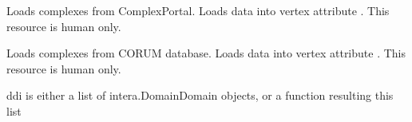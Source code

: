 \documentclass[letterpaper,10pt,english]{sphinxmanual}
\begin{document}
\begin{fulllineitems}
\begin{fulllineitems}
\end{fulllineitems}


\begin{fulllineitems}
\label{\detokenize{main:pypath.main.PyPath.load_complexportal}}
Loads complexes from ComplexPortal. Loads data into vertex attribute
.
This resource is human only.

\end{fulllineitems}


\begin{fulllineitems}
\label{\detokenize{main:pypath.main.PyPath.load_comppi}}
\end{fulllineitems}


\begin{fulllineitems}
\label{\detokenize{main:pypath.main.PyPath.load_corum}}
Loads complexes from CORUM database. Loads data into vertex attribute
.
This resource is human only.

\end{fulllineitems}


\begin{fulllineitems}
\label{\detokenize{main:pypath.main.PyPath.load_dbptm}}
\end{fulllineitems}


\begin{fulllineitems}
\label{\detokenize{main:pypath.main.PyPath.load_ddi}}
ddi is either a list of intera.DomainDomain objects,
or a function resulting this list


\end{fulllineitems}
\end{fulllineitems}
\end{document}
